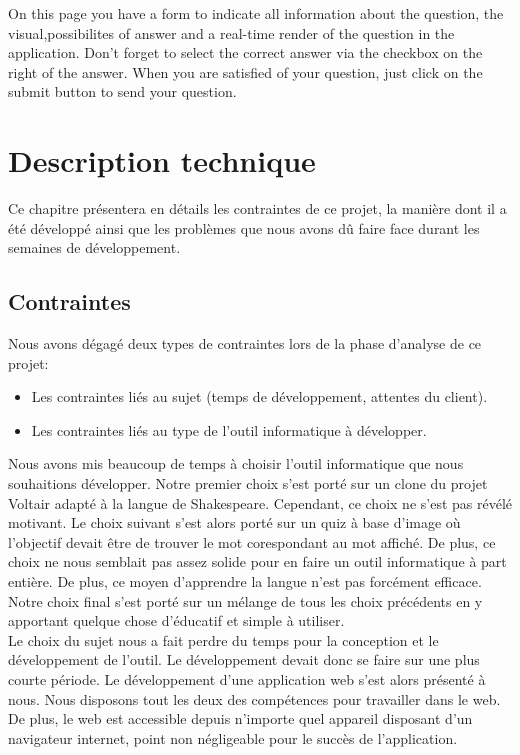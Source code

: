 \documentclass[a4paper,11pt, oneside]{book}
\begin{document}
On this page you have a form to indicate all information about the question, the visual,possibilites of answer and a real-time render of the question in the application.
Don't forget to select the correct answer via the checkbox on the right of the answer. When you are satisfied of your question, just click on the submit button to send your question.

\newpage
\chapter{Description technique}

	Ce chapitre présentera en détails les contraintes de ce projet, la manière dont il a été développé ainsi que les problèmes que nous avons dû faire face
	durant les semaines de développement.

	\section{Contraintes}

	Nous avons dégagé deux types de contraintes lors de la phase d'analyse de ce projet:
	\begin{itemize}
		\item Les contraintes liés au sujet (temps de développement, attentes du client).
		\item Les contraintes liés au type de l'outil informatique à développer.\\
	\end{itemize}
Nous avons mis beaucoup de temps à choisir l'outil informatique que nous souhaitions développer. Notre premier choix s'est porté sur un clone du projet Voltair adapté à la langue de Shakespeare.
Cependant, ce choix ne s'est pas révélé motivant. Le choix suivant s'est alors porté sur un quiz à base d'image où l'objectif devait être de trouver le mot corespondant au mot affiché. De plus, ce choix
ne nous semblait pas assez solide pour en faire un outil informatique à part entière. De plus, ce moyen d'apprendre la langue n'est pas forcément efficace.
Notre choix final s'est porté sur un mélange de tous les choix précédents en y apportant quelque chose d'éducatif et simple à utiliser.\\

Le choix du sujet nous a fait perdre du temps pour la conception et le développement de l'outil. Le développement devait donc se faire sur une plus courte période.
Le développement d'une application web s'est alors présenté à nous. Nous disposons tout les deux des compétences pour travailler dans le web.
De plus, le web est accessible depuis n'importe quel appareil disposant d'un navigateur internet, point non négligeable pour le succès de l'application.\\
\end{document}
